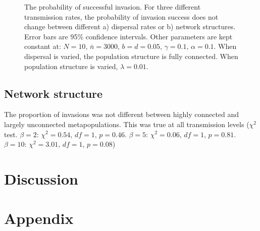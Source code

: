 \begin{figure}[b]
\caption[Invasion probability]{
The probability of successful invasion. 
For three different transmission rates, the probability of invasion success does not change between different a) dispersal rates or b) network structures. 
Error bars are 95\% confidence intervals. 
Other parameters are kept constant at: $N = 10,\, \bar{n} = 3000,\, b = d = 0.05,\, \gamma = 0.1,\, \alpha = 0.1$. 
When dispersal is varied, the population structure is fully connected. When population structure is varied, $\lambda = 0.01$.
}
\label{f:dist}
\end{figure}


\subsection{Network structure}



The proportion of invasions was not different between highly connected and largely unconnected metapopulations. 
This was true at all transmission levels ($\chi^2$ test. $\beta = 2$: $\chi^2 = 0.54$, $df = 1$, $p = 0.46$. $\beta = 5$: $\chi^2 = 0.06$, $df = 1$, $p = 0.81$. $\beta = 10$: $\chi^2 = 3.01$, $df = 1$, $p = 0.08$)

 





\clearpage
\section{Discussion}






\clearpage
\section{Appendix}

